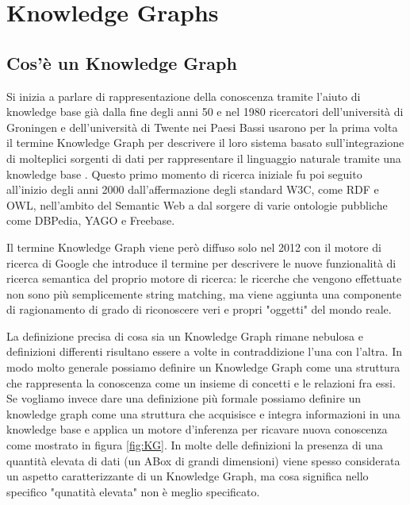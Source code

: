 \chapter{Knowledge Graphs}
\label{cha:vkg}

\section{Cos'è un Knowledge Graph}
\label{sec:kg_description}

Si inizia a parlare di rappresentazione della conoscenza tramite l'aiuto di knowledge base già dalla fine degli anni 50 e nel 1980 ricercatori dell'università di Groningen 
e dell'università di Twente nei Paesi Bassi usarono per la prima volta il termine Knowledge Graph per descrivere il loro sistema basato sull'integrazione di molteplici sorgenti
di dati per rappresentare il linguaggio naturale tramite una knowledge base .
Questo primo momento di ricerca iniziale fu poi seguito all'inizio degli anni 2000 dall'affermazione degli standard W3C, come RDF e OWL, nell'ambito del 
Semantic Web a dal sorgere di varie ontologie pubbliche come DBPedia, YAGO e Freebase. \cite{KGDefinition} \cite{KGSurvey}

Il termine Knowledge Graph viene però diffuso solo nel 2012 con il motore di ricerca di Google che introduce il termine per descrivere
le nuove funzionalità di ricerca semantica del proprio motore di ricerca: le ricerche che vengono effettuate non sono più semplicemente string matching,
ma viene aggiunta una componente di ragionamento di grado di riconoscere veri e propri "oggetti" del mondo reale. \cite{KGDefinition}

La definizione precisa di cosa sia un Knowledge Graph rimane nebulosa e definizioni differenti risultano essere a volte in contraddizione l'una con l'altra. 
In modo molto generale possiamo definire un Knowledge Graph come una struttura che rappresenta la conoscenza come un insieme di concetti e le relazioni fra essi.
Se vogliamo invece dare una definizione più formale possiamo definire un knowledge graph come una struttura che acquisisce e integra informazioni in una knowledge base
e applica un motore d'inferenza per ricavare nuova conoscenza come mostrato in figura \ref{fig:KG}.
In molte delle definizioni la presenza di una quantità elevata di dati (un ABox di grandi dimensioni) viene spesso considerata un aspetto caratterizzante di un Knowledge Graph,
ma cosa significa nello specifico "qunatità elevata" non è meglio specificato.

